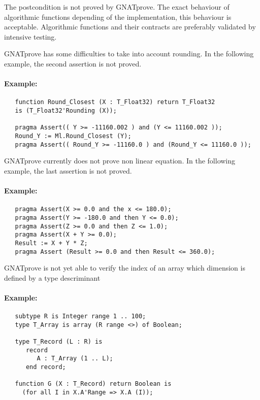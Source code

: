 \documentclass[10pt,a4paper,twocolumn]{article}
\newcommand{\gnatprove}{GNATprove\xspace}
\begin{document}
The postcondition is not proved by \gnatprove.
The exact behaviour of algorithmic functions depending of the implementation, this behaviour is acceptable.
Algorithmic functions and their contracts are preferably validated by intensive testing.

\gnatprove has some difficulties to take into account rounding.
In the following example, the second assertion is not proved.

\paragraph{Example:}

\begin{verbatim}
   function Round_Closest (X : T_Float32) return T_Float32
   is (T_Float32'Rounding (X));

   pragma Assert(( Y >= -11160.002 ) and (Y <= 11160.002 ));
   Round_Y := Ml.Round_Closest (Y);
   pragma Assert(( Round_Y >= -11160.0 ) and (Round_Y <= 11160.0 ));
\end{verbatim}

\gnatprove currently does not prove non linear equation.
In the following example, the last assertion is not proved.

\paragraph{Example:}

\begin{verbatim}
   pragma Assert(X >= 0.0 and the x <= 180.0);
   pragma Assert(Y >= -180.0 and then Y <= 0.0);
   pragma Assert(Z >= 0.0 and then Z <= 1.0);
   pragma Assert(X + Y >= 0.0);
   Result := X + Y * Z;
   pragma Assert (Result >= 0.0 and then Result <= 360.0);
\end{verbatim}

\gnatprove is not yet able to verify the index of an array which dimension is defined by a type descriminant

\paragraph{Example:}

\begin{verbatim}
   subtype R is Integer range 1 .. 100;
   type T_Array is array (R range <>) of Boolean;

   type T_Record (L : R) is
      record
         A : T_Array (1 .. L);
      end record;

   function G (X : T_Record) return Boolean is
     (for all I in X.A'Range => X.A (I));
\end{verbatim}
\end{document}
